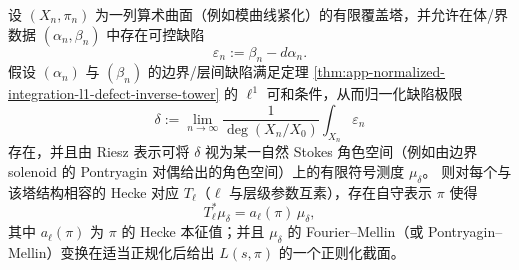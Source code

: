 \begin{conjecture}\label{conj:app-normalized-stokes-defect-measure-hecke-langlands}
设 \((X_n,\pi_n)\) 为一列算术曲面（例如模曲线紧化）的有限覆盖塔，并允许在体/界数据 \((\alpha_n,\beta_n)\) 中存在可控缺陷
\[
\varepsilon_n:=\beta_n-d\alpha_n.
\]
假设 \((\alpha_n)\) 与 \((\beta_n)\) 的边界/层间缺陷满足定理 \ref{thm:app-normalized-integration-l1-defect-inverse-tower} 的 \(\ell^1\) 可和条件，从而归一化缺陷极限
\[
\delta:=\lim_{n\to\infty}\frac{1}{\deg(X_n/X_0)}\int_{X_n}\varepsilon_n
\]
存在，并且由 Riesz 表示可将 \(\delta\) 视为某一自然 Stokes 角色空间（例如由边界 solenoid 的 Pontryagin 对偶给出的角色空间）上的有限符号测度 \(\mu_\delta\)。
则对每个与该塔结构相容的 Hecke 对应 \(T_\ell\)（\(\ell\) 与层级参数互素），存在自守表示 \(\pi\) 使得
\[
T_\ell^\ast\mu_\delta=a_\ell(\pi)\,\mu_\delta,
\]
其中 \(a_\ell(\pi)\) 为 \(\pi\) 的 Hecke 本征值；并且 \(\mu_\delta\) 的 Fourier--Mellin（或 Pontryagin--Mellin）变换在适当正规化后给出 \(L(s,\pi)\) 的一个正则化截面。
\end{conjecture}

